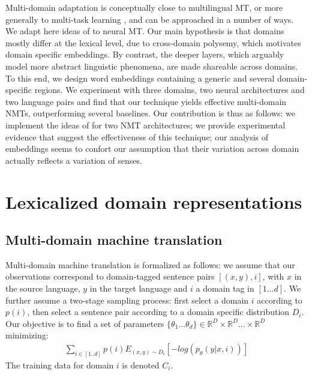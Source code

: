 \documentclass[11pt,a4paper]{article}
\newcommand{\fyDone}[1]{\done[FY]\Todo[FY:]{\textcolor{orange}{#1}}}
\begin{document}
Multi-domain adaptation is conceptually close to multilingual MT, or more generally to multi-task learning \cite{Caruana97multitask}, and can be approached in a number of ways. We adapt here ideas of \citet{Daume07frustratingly} to neural MT.
Our main hypothesis is that domains mostly differ at the lexical level, due to cross-domain polysemy, which motivates domain specific embeddings. By contrast, the deeper layers, which arguably model more abstract linguistic phenomena, are made shareable across domains. To this end, we design word embeddings containing a generic and several domain-specific regions. We experiment with three domains, two neural architectures and two language pairs and find that our technique yields effective multi-domain NMTs, outperforming several baselines. Our contribution is thus as follows:
we implement the ideas of \cite{Daume07frustratingly} for two NMT architectures;
we provide experimental evidence that suggest the effectiveness of this technique;
our analysis of embeddings seems to confort our assumption that their variation across domain actually reflects a variation of senses.
\fyDone{can we train in random order ? can we get away with catastrophic forgetting ?}
\fyDone{how to analyze the embeddings ? how can we test or claim ?}

\section{Lexicalized domain representations\label{sec:lexicalized_embeddings}}
\fyDone{Use meaningful titles throughout}

\subsection{Multi-domain machine translation \label{ssec:statement}}

Multi-domain machine translation is formalized as follows: we assume that our observations correspond to  domain-tagged sentence pairs $[(x,y),i]$, with $x$ in the source language, $y$ in the target language and $i$ a domain tag in $[1\dots d]$. We further assume a two-stage sampling process: first select a domain $i$ according to $p(i)$, then select a sentence pair according to a domain specific distribution $D_i$. Our objective is to find a set of parameters $\{\theta_1 \dots \theta_d \} \in \mathbb{R}^D \times \mathbb{R}^D \dots \times \mathbb{R}^D$ minimizing:
\begin{equation} \label{eq:loss}
\begin{split}
\sum_{i \in [1..d]} p(i) E_{(x,y) \sim D_{i}} [-log(p_{\theta}(y|x,i))]
\end{split}
\end{equation}
The training data for domain $i$ is denoted $C_i$.
\end{document}
